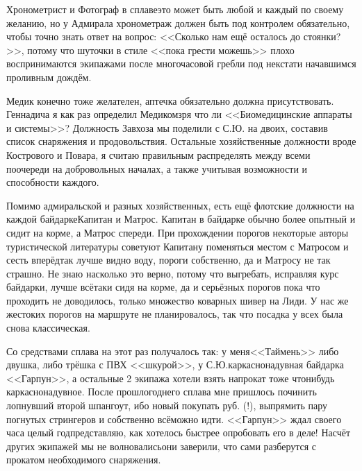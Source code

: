 Хронометрист и Фотограф в сплаве\mdash это может быть любой и каждый по своему желанию, но у Адмирала хронометраж должен быть под контролем обязательно, чтобы точно знать ответ на вопрос: <<Сколько нам ещё осталось до стоянки?>>, потому что шуточки в стиле <<пока грести можешь>> плохо воспринимаются экипажами после многочасовой гребли под некстати начавшимся проливным дождём. 

Медик конечно тоже желателен, аптечка обязательно должна присутствовать. Геннадича я как раз определил Медиком\mdash зря что ли <<Биомедицинские аппараты и системы>>? Должность Завхоза мы поделили с С.Ю. на двоих, составив список снаряжения и продовольствия. Остальные хозяйственные должности вроде Кострового и Повара, я считаю правильным распределять между всеми по\sdash очереди на добровольных началах, а также учитывая возможности и способности каждого. 

Помимо адмиральской и разных хозяйственных, есть ещё флотские должности на каждой байдарке\mdash Капитан и Матрос. Капитан в байдарке обычно более опытный и сидит на корме, а Матрос спереди. При прохождении порогов некоторые авторы туристической литературы советуют Капитану поменяться местом с Матросом и сесть вперёд\mdash так лучше видно воду, пороги собственно, да и Матросу не так страшно. Не знаю насколько это верно, потому что выгребать, исправляя курс байдарки, лучше всё\sdash таки сидя на корме, да и серьёзных порогов пока что проходить не доводилось, только множество коварных шивер на Лиди. У нас же жестоких порогов на маршруте не планировалось, так что посадка у всех была снова классическая. 

Со средствами сплава на этот раз получалось так: у меня\mdash <<Таймень>>  либо двушка, либо трёшка с ПВХ <<шкурой>>, у С.Ю.\mdash каркасно\sdash надувная байдарка <<Гарпун>>, а остальные 2 экипажа хотели взять напрокат тоже что\sdash нибудь каркасно\sdash надувное. После прошлогоднего сплава мне пришлось починить лопнувший второй шпангоут, ибо новый покупать руб. (!), выпрямить пару погнутых стрингеров и собственно всё\mdash можно идти. <<Гарпун>> ждал своего часа целый год\mdash представляю, как хотелось быстрее опробовать его в деле! Насчёт других экипажей мы не волновались\mdash они заверили, что сами разберутся с прокатом необходимого снаряжения. 

